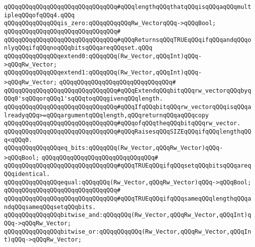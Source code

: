 \verb|qQQqqQQqqQQqqQQqqQQqqQQqqQQqqQQq#qQQqlengthqQQqthatqQQqisqQQqaqQQqmultipleqQQqofqQQq4.qQQq|\newline
\newline
\verb|qQQqqQQqqQQqqQQqis_zero:qQQqqQQqqQQqRw_VectorqQQq->qQQqBool;|\newline
\verb|qQQqqQQqqQQqqQQqqQQqqQQqqQQqqQQq#|\newline
\verb|qQQqqQQqqQQqqQQqqQQqqQQqqQQqqQQq#qQQqReturnsqQQqTRUEqQQqifqQQqandqQQqonlyqQQqifqQQqnoqQQqbitsqQQqareqQQqset.qQQq|\newline
\newline
\verb|qQQqqQQqqQQqqQQqextend0:qQQqqQQq(Rw_Vector,qQQqInt)qQQq->qQQqRw_Vector;|\newline
\verb|qQQqqQQqqQQqqQQqextend1:qQQqqQQq(Rw_Vector,qQQqInt)qQQq->qQQqRw_Vector;|\newline
\verb|qQQqqQQqqQQqqQQqqQQqqQQqqQQqqQQq#|\newline
\verb|qQQqqQQqqQQqqQQqqQQqqQQqqQQqqQQq#qQQqExtendqQQqbitqQQqrw_vectorqQQqbyqQQq0'sqQQqorqQQq1'sqQQqtoqQQqgivenqQQqlength.|\newline
\verb|qQQqqQQqqQQqqQQqqQQqqQQqqQQqqQQq#qQQqIfqQQqbitqQQqrw_vectorqQQqisqQQqalreadyqQQq>=qQQqargumentqQQqlength,qQQqreturnqQQqaqQQqcopy|\newline
\verb|qQQqqQQqqQQqqQQqqQQqqQQqqQQqqQQq#qQQqofqQQqtheqQQqbitqQQqrw_vector.|\newline
\verb|qQQqqQQqqQQqqQQqqQQqqQQqqQQqqQQq#qQQqRaisesqQQqSIZEqQQqifqQQqlengthqQQq<qQQq0.|\newline
\newline
\verb|qQQqqQQqqQQqqQQqeq_bits:qQQqqQQq(Rw_Vector,qQQqRw_Vector)qQQq->qQQqBool;|\newline
\verb|qQQqqQQqqQQqqQQqqQQqqQQqqQQqqQQq#|\newline
\verb|qQQqqQQqqQQqqQQqqQQqqQQqqQQqqQQq#qQQqTRUEqQQqifqQQqsetqQQqbitsqQQqareqQQqidentical.|\newline
\newline
\verb|qQQqqQQqqQQqqQQqequal:qQQqqQQq(Rw_Vector,qQQqRw_Vector)qQQq->qQQqBool;|\newline
\verb|qQQqqQQqqQQqqQQqqQQqqQQqqQQqqQQq#|\newline
\verb|qQQqqQQqqQQqqQQqqQQqqQQqqQQqqQQq#qQQqTRUEqQQqifqQQqsameqQQqlengthqQQqandqQQqsameqQQqsetqQQqbits.|\newline
\newline
\verb|qQQqqQQqqQQqqQQqbitwise_and:qQQqqQQq(Rw_Vector,qQQqRw_Vector,qQQqInt)qQQq->qQQqRw_Vector;|\newline
\verb|qQQqqQQqqQQqqQQqbitwise_or:qQQqqQQqqQQq(Rw_Vector,qQQqRw_Vector,qQQqInt)qQQq->qQQqRw_Vector;|\newline
